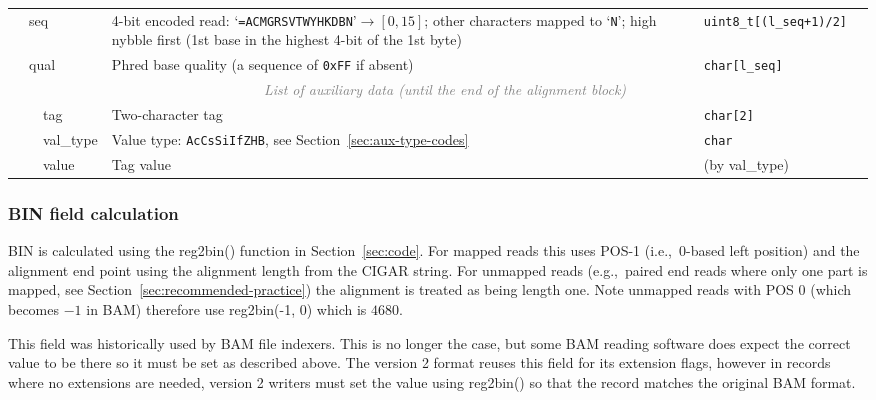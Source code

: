 \documentclass[10pt]{article}
\begin{document}
\begin{table}[!ht]
{\begin{tabular}{|l|l|l|p{8.15cm}|l|r|}
  & \multicolumn{2}{l|}{\sf seq} & 4-bit encoded read: `{\tt =ACMGRSVTWYHKDBN}'$\to[0,15]$; other characters mapped to `{\tt N}'; high nybble first (1st base in the highest 4-bit of the 1st byte) & {\tt uint8\_t[({\sf l\_seq}+1)/2]} & \\\cline{2-6}
  & \multicolumn{2}{l|}{\sf qual} & Phred base quality (a sequence of {\tt 0xFF} if absent) & {\tt char[{\sf l\_seq}]} & \\\cline{2-6}
  & \multicolumn{5}{c|}{\textcolor{gray}{\it List of auxiliary data (until the end of the alignment block)}} \\\cline{3-6}
  & & {\sf tag} & Two-character tag & {\tt char[2]} & \\\cline{3-6}
  & & {\sf val\_type} & Value type: {\tt AcCsSiIfZHB}, see Section~\ref{sec:aux-type-codes} & {\tt char} & \\\cline{3-6}
  & & {\sf value} & Tag value & (by {\sf val\_type}) &\\
  \cline{1-6}
\end{tabular}}
\end{table}
\addtocounter{footnote}{-2}

\subsubsection{BIN field calculation}\label{sec:bin-field}
{\sf BIN} is calculated using the {\sf reg2bin()} function in
Section~\ref{sec:code}.
For mapped reads this uses {\sf POS-1} (i.e.,~0-based left position) and the
alignment end point using the alignment length from the {\sf CIGAR} string.
For unmapped reads (e.g.,~paired end reads where only one part is mapped, see
Section~\ref{sec:recommended-practice}) the alignment is treated as
being length one.
Note unmapped reads with {\sf POS} $0$ (which becomes $-1$ in BAM) therefore
use {\sf reg2bin(-1, 0)} which is $4680$.

This field was historically used by BAM file indexers.  This is no longer the
case, but some BAM reading software does expect the correct value to be there
so it must be set as described above.  The version 2 format reuses this field
for its extension flags, however in records where no extensions are needed,
version 2 writers must set the value using {\sf reg2bin()} so that the record
matches the original BAM format.
\end{document}
